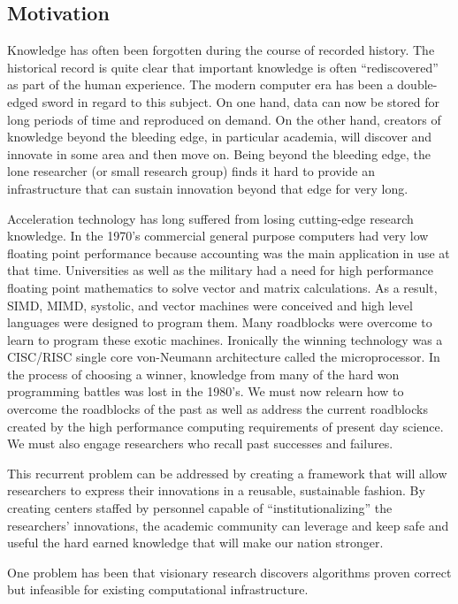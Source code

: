 \subsection{Motivation}
Knowledge has often been forgotten during the course of recorded history.
The historical record is quite clear that important knowledge is often ``rediscovered'' as part of the human experience.
The modern computer era has been a double-edged sword in regard to this subject.
On one hand, data can now be stored for long periods of time and reproduced on demand. 
On the other hand, creators of knowledge beyond the bleeding edge, in particular academia,
will discover and innovate in some area and then move on. 
Being beyond the bleeding edge, the lone researcher (or small research group) finds it hard to provide an infrastructure that can sustain innovation beyond that edge for very long.

Acceleration technology has long suffered from losing cutting-edge research knowledge. 
In the 1970's commercial general purpose computers had very low floating point performance because accounting was the main application in use at that time. 
Universities as well as the military had a need for high performance floating point mathematics to solve vector and matrix calculations. 
As a result, SIMD, MIMD, systolic, and vector machines were conceived and high level languages were designed to program them. 
Many roadblocks were overcome to learn to program these exotic machines. 
Ironically the winning technology was a CISC/RISC single core von-Neumann architecture called the microprocessor. 
In the process of choosing a winner, knowledge from many of the hard won programming battles was lost in the 1980's. 
We must now relearn how to overcome the roadblocks of the past as well as address the current roadblocks created by the high performance computing requirements of present day science. 
We must also engage researchers who recall past successes and failures.

This recurrent problem can be addressed by creating a framework that will allow researchers to express their innovations in a reusable, sustainable fashion. 
By creating centers staffed by personnel capable of ``institutionalizing'' the researchers' innovations, the academic community can leverage and keep safe and useful the hard earned knowledge that will make our nation stronger.

One problem has been that visionary research discovers algorithms proven correct but infeasible for existing computational infrastructure.


